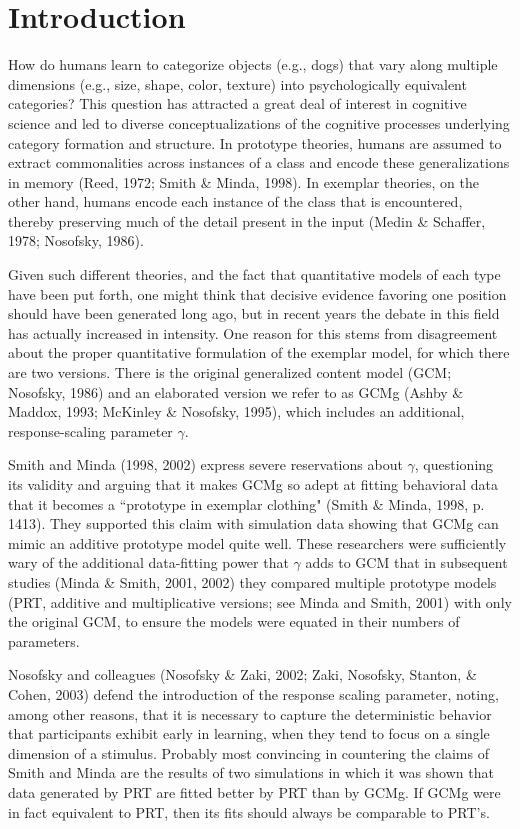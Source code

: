 \documentclass[11pt]{article}
\begin{document}


\section{Introduction}
How do humans learn to categorize objects (e.g., dogs) that vary along multiple dimensions (e.g.,
size, shape, color, texture) into psychologically equivalent categories? This question has
attracted a great deal of interest in cognitive science and led to diverse conceptualizations of
the cognitive processes underlying category formation and structure. In prototype theories, humans
are assumed to extract commonalities across instances of a class and encode these generalizations
in memory (Reed, 1972; Smith \& Minda, 1998). In exemplar theories, on the other hand, humans
encode each instance of the class that is encountered, thereby preserving much of the detail
present in the input (Medin \& Schaffer, 1978;  Nosofsky, 1986).


Given such different theories, and the fact that quantitative models of each type have been put
forth, one might think that decisive evidence favoring one position should have been generated
long ago, but in recent years the debate in this field has actually increased in intensity. One
reason for this stems from disagreement about the proper quantitative formulation of the exemplar
model, for which there are two versions. There is the original generalized content model (GCM;
Nosofsky, 1986) and an elaborated version we refer to as GCMg (Ashby \& Maddox, 1993; McKinley \&
Nosofsky, 1995), which includes an additional, response-scaling parameter
$\gamma$.\footnotemark[1]


Smith and Minda (1998, 2002) express severe reservations about $\gamma$, questioning its validity
and arguing that it makes GCMg so adept at fitting behavioral data that it becomes a ``prototype
in exemplar clothing" (Smith \& Minda, 1998, p. 1413). They supported this claim with simulation
data showing that GCMg can mimic an additive prototype model quite well. These researchers were
sufficiently wary of the additional data-fitting power that $\gamma$  adds to GCM that in
subsequent studies (Minda \& Smith, 2001, 2002) they compared multiple prototype models (PRT,
additive and multiplicative versions\footnotemark[2]; see Minda and Smith, 2001) with only the
original GCM, to ensure the models were equated in their numbers of parameters.


Nosofsky and colleagues (Nosofsky \& Zaki, 2002; Zaki, Nosofsky, Stanton, \& Cohen, 2003) defend
the introduction of the response scaling parameter, noting, among other reasons, that it is
necessary to capture the deterministic behavior that participants exhibit early in learning, when
they tend to focus on a single dimension of a stimulus. Probably most convincing in countering the
claims of Smith and Minda are the results of two simulations in which it was shown that data
generated by PRT are fitted better by PRT than by GCMg. If GCMg were in fact equivalent to PRT, then
its fits should always be comparable to PRT's.
\end{document}
